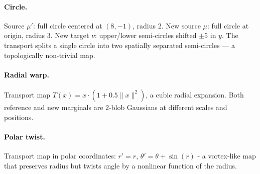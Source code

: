 \documentclass[11pt]{article}
\theoremstyle{definition}
\numberwithin{equation}{section}%
\begin{document}
\paragraph{Circle.}
Source $\mu'$: full circle centered at $(8,-1)$, radius 2.
New source $\mu$: full circle at origin, radius 3.
New target $\nu$: upper/lower semi-circles shifted $\pm 5$ in $y$.
The transport splits a single circle into two spatially separated
semi-circles — a topologically non-trivial map.

\paragraph{Radial warp.}
Transport map $T(x) = x \cdot (1 + 0.5\|x\|^2)$, a cubic radial
expansion. Both reference and new marginals are 2-blob Gaussians at
different scales and positions.


\paragraph{Polar twist.}
Transport map in polar coordinates: $r' = r$, $\theta' = \theta + \sin(r)$
- a vortex-like map that preserves radius but twists angle by a nonlinear function of the radius.
\end{document}
